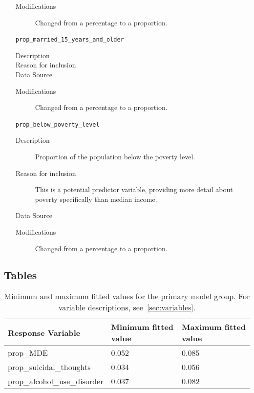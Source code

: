 \documentclass{article}
\begin{document}
\begin{itemize}[label={}, align=left]
\begin{description}
              \item[Modifications] Changed from a percentage to a proportion.
          \end{description}
    \item[\texttt{prop\_married\_15\_years\_and\_older}] \
          \begin{description}
              \item[Description] 
              \item[Reason for inclusion] \maritalreason
              \item[Data Source] \cite{acs_education_data}
              \item[Modifications] Changed from a percentage to a proportion.
          \end{description}
    \item[\texttt{prop\_below\_poverty\_level}] \
          \begin{description}
              \item[Description] Proportion of the population below the poverty level.
              \item[Reason for inclusion] This is a potential predictor
                    variable, providing more detail about poverty specifically
                    than median income.
              \item[Data Source] \cite{acs_poverty_data}
              \item[Modifications] Changed from a percentage to a proportion.
          \end{description}
\end{itemize}

\pagebreak

\subsection{Tables}

\begin{table}[!htb]
\begin{center}
\begin{tabular}{l l l}
    \hline
    Response Variable & Minimum fitted value & Maximum fitted value\\
    \hline
    prop\_MDE & 0.052 & 0.085\\
    prop\_suicidal\_thoughts & 0.034 & 0.056\\
    prop\_alcohol\_use\_disorder & 0.037 & 0.082\\
    \hline
\end{tabular}
\end{center}
\caption{\label{tab:fitted} Minimum and maximum fitted values
    for the primary model group. For variable descriptions,
    see~\ref{sec:variables}.
}
\end{table}

\pagebreak

\printbibliography
\end{document}
